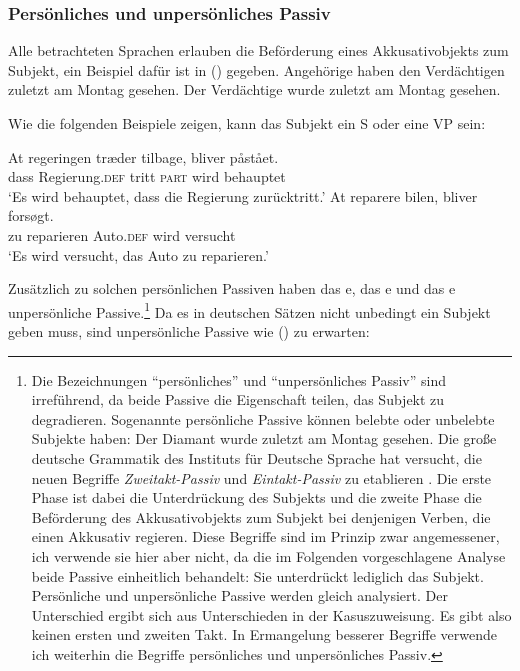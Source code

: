 \subsubsection{Persönliches und unpersönliches Passiv}
\label{sec-impersonal-passive-phen}

Alle betrachteten Sprachen erlauben die Beförderung eines Akkusativobjekts zum Subjekt, ein
Beispiel dafür ist in () gegeben.
\eal
\ex Angehörige haben den Verdächtigen zuletzt am Montag gesehen.
\ex Der Verdächtige wurde  zuletzt am Montag gesehen.
\zl

\noindent
Wie die folgenden Beispiele zeigen, kann das Subjekt ein S oder eine VP sein:

\eal
\ex
\gll At regeringen træder tilbage, bliver påstået.\\
     dass Regierung.\textsc{def} tritt \textsc{part} wird behauptet\\\danish
\glt `Es wird behauptet, dass die Regierung zurücktritt.'
\ex
\gll At reparere bilen, bliver forsøgt.\\
     zu reparieren Auto.\textsc{def} wird versucht\\
\glt `Es wird versucht, das Auto zu reparieren.'
\zl

\noindent
Zusätzlich zu solchen persönlichen Passiven haben das e, das e und das e unpersönliche
Passive.\footnote{
Die Bezeichnungen "`persönliches"' und "`unpersönliches Passiv"' sind irreführend, da beide Passive die Eigenschaft teilen, das Subjekt zu degradieren. Sogenannte persönliche Passive können belebte oder unbelebte Subjekte haben:
\ea 
Der        Diamant wurde  zuletzt am Montag gesehen.
\z
Die große deutsche Grammatik des Instituts für Deutsche Sprache hat versucht, die neuen Begriffe \emph{Zweitakt-Passiv} und
\emph{Eintakt-Passiv} zu etablieren \citep[]{Zifonun97b}. Die erste Phase ist dabei die Unterdrückung des Subjekts und
die zweite Phase die Beförderung des Akkusativobjekts zum Subjekt bei denjenigen Verben, die einen
Akkusativ regieren. Diese Begriffe sind im Prinzip zwar angemessener, ich verwende sie hier aber nicht, da die
im Folgenden vorgeschlagene Analyse beide Passive einheitlich behandelt: Sie unterdrückt lediglich das
Subjekt. Persönliche und unpersönliche Passive werden gleich analysiert. Der Unterschied ergibt sich aus
Unterschieden in der Kasuszuweisung. Es gibt also keinen ersten und zweiten Takt. In Ermangelung besserer Begriffe verwende ich weiterhin die Begriffe persönliches und
unpersönliches Passiv.
} Da es in deutschen Sätzen nicht unbedingt ein Subjekt geben muss, sind unpersönliche Passive wie () zu erwarten:

